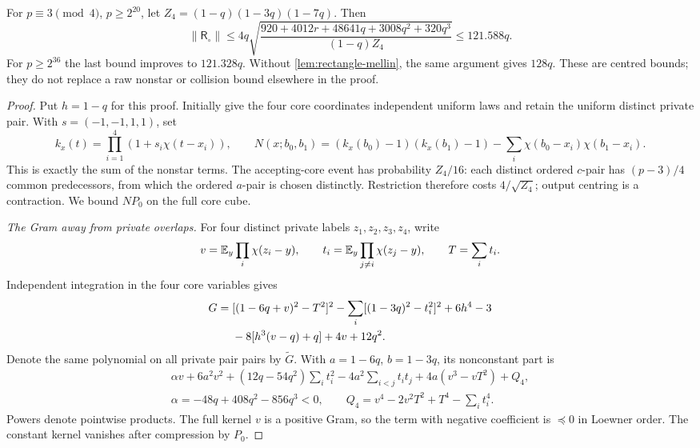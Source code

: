 \begin{theorem}\label{thm:rectangle-gram}
For $p\equiv3\pmod4$, $p\ge2^{20}$, let
$Z_4=(1-q)(1-3q)(1-7q)$. Then
\begin{equation}\label{eq:rectangle-gram-cap}
 \|\mathsf R_\circ\|\le
 4q\sqrt{\frac{920+4012r+48641q+3008q^2+320q^3}{(1-q)Z_4}}
 \le121.588q.
\end{equation}
For $p\ge2^{36}$ the last bound improves to $121.328q$.
Without \cref{lem:rectangle-mellin}, the same argument gives $128q$.
These are centred bounds; they do not replace a raw nonstar or
collision bound elsewhere in the proof.
\end{theorem}

\begin{proof}
Put $h=1-q$ for this proof. Initially give the four core coordinates
independent uniform laws and retain the uniform distinct private pair.
With $s=(-1,-1,1,1)$, set
\[
 k_x(t)=\prod_{i=1}^4(1+s_i\chi(t-x_i)),\qquad
 N(x;b_0,b_1)=(k_x(b_0)-1)(k_x(b_1)-1)
       -\sum_i\chi(b_0-x_i)\chi(b_1-x_i).
\]
This is exactly the sum of the nonstar terms. The accepting-core
event has probability $Z_4/16$: each distinct ordered $c$-pair has
$(p-3)/4$ common predecessors, from which the ordered $a$-pair is
chosen distinctly. Restriction therefore costs $4/\sqrt{Z_4}$;
output centring is a contraction. We bound $NP_0$ on the full core cube.

\emph{The Gram away from private overlaps.}
For four distinct private labels $z_1,z_2,z_3,z_4$, write
\[
 v=\mathbb E_y\prod_i\chi(z_i-y),\qquad
 t_i=\mathbb E_y\prod_{j\ne i}\chi(z_j-y),\qquad T=\sum_i t_i.
\]
Independent integration in the four core variables gives
\begin{align}
 G={}&[(1-6q+v)^2-T^2]^2
       -\sum_i[(1-3q)^2-t_i^2]^2+6h^4-3\notag\\
    &-8[h^3(v-q)+q]+4v+12q^2.\label{eq:rectangle-gram-polynomial}
\end{align}
Denote the same polynomial on all private pair pairs by $\widetilde G$.
With $a=1-6q$, $b=1-3q$, its nonconstant part is
\begin{align*}
 \alpha v+6a^2v^2+(12q-54q^2)\sum_i t_i^2
 -4a^2\sum_{i<j}t_it_j+4a(v^3-vT^2)+Q_4,\\
 \alpha=-48q+408q^2-856q^3<0,\qquad
 Q_4=v^4-2v^2T^2+T^4-\sum_i t_i^4.
\end{align*}
Powers denote pointwise products. The full kernel $v$ is a positive
Gram, so the term with negative coefficient is $\preceq0$ in Loewner order.
The constant kernel vanishes after compression by $P_0$.


\end{proof}
